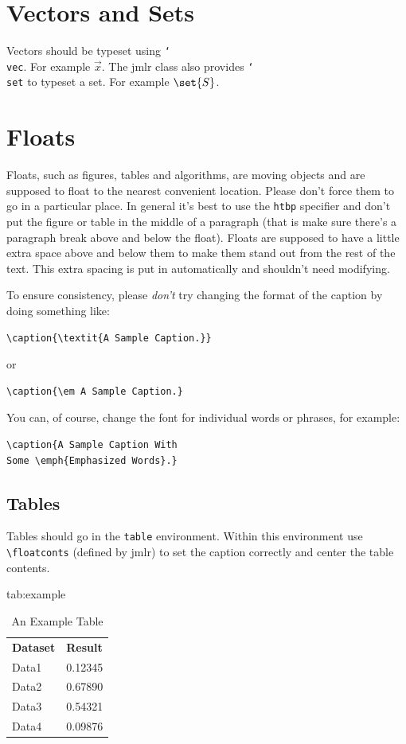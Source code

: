 \documentclass[mlmain]{jmlr}
\newcommand{\cs}[1]{\texttt{\char`\\#1}}
\begin{document}
\section{Vectors and Sets}
\label{sec:vec}

Vectors should be typeset using \cs{vec}. For example $\vec{x}$.
The \textsf{jmlr} class also provides \cs{set} to typeset a
set. For example $\set{S}$.

\section{Floats}
\label{sec:floats}

Floats, such as figures, tables and algorithms, are moving
objects and are supposed to float to the nearest convenient
location. Please don't force them to go in a particular place. In
general it's best to use the \texttt{htbp} specifier and don't
put the figure or table in the middle of a paragraph (that is
make sure there's a paragraph break above and below the float).
Floats are supposed to have a little extra space above and below
them to make them stand out from the rest of the text. This extra
spacing is put in automatically and shouldn't need modifying.

To ensure consistency, please \emph{don't} try changing the format of the caption by doing
something like:
\begin{verbatim}
\caption{\textit{A Sample Caption.}}
\end{verbatim}
or
\begin{verbatim}
\caption{\em A Sample Caption.}
\end{verbatim}
You can, of course, change the font for individual words or 
phrases, for example:
\begin{verbatim}
\caption{A Sample Caption With 
Some \emph{Emphasized Words}.}
\end{verbatim}

\subsection{Tables}
\label{sec:tables}

Tables should go in the \texttt{table} environment. Within this
environment use \verb|\floatconts| (defined by \textsf{jmlr})
to set the caption correctly and center the table contents.

\begin{table}[htbp]
\floatconts
  {tab:example}%
  {\caption{An Example Table}}%
  {\begin{tabular}{ll}
  \bfseries Dataset & \bfseries Result\\
  Data1 & 0.12345\\
  Data2 & 0.67890\\
  Data3 & 0.54321\\
  Data4 & 0.09876
  \end{tabular}}
\end{table}
\end{document}
